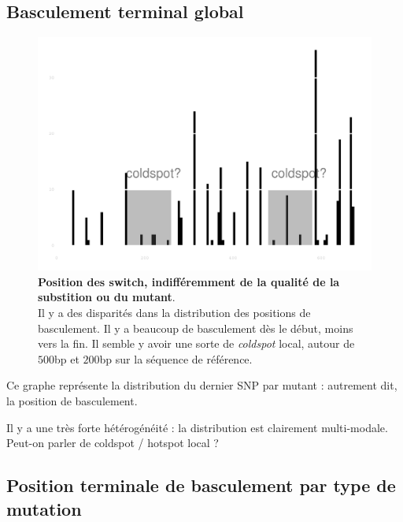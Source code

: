 \documentclass[a4paper]{tufte-handout}
\begin{document}
\subsection{Basculement terminal global}
\label{sec:orgheadline9}
\begin{figure}
  \centering
  \includegraphics[width=\linewidth]{../switch_position_globale.pdf}
  \caption{\textbf{Position des switch, indifféremment de la qualité de la
      substition ou du mutant}. \\
    Il y a des disparités dans la distribution des positions de basculement. Il
    y a beaucoup de basculement dès le début, moins vers la fin. Il semble y
    avoir une sorte de \emph{coldspot} local, autour de $500$bp et $200$bp sur
    la séquence de référence. }
\end{figure}

Ce graphe représente la distribution du dernier SNP par mutant : autrement dit,
la position de basculement. 

Il y a une très forte hétérogénéité : la distribution est clairement
multi-modale. Peut-on parler de coldspot / hotspot local ?

\newpage
\subsection{Position terminale de basculement par type de mutation}
\label{sec:orgheadline10}
\end{document}
